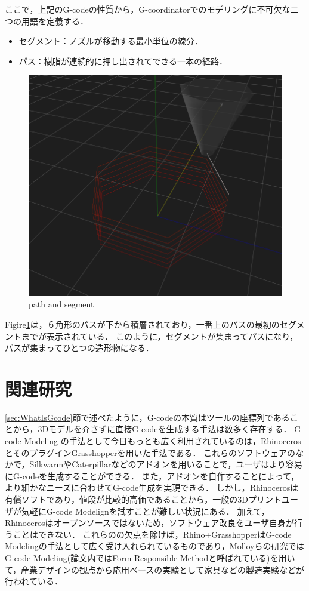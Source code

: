 \documentclass{article}
\begin{document}
\begin{twocolumn}
ここで，上記のG-codeの性質から，G-coordinatorでのモデリングに不可欠な二つの用語を定義する．
\begin{itemize}
  \item セグメント：ノズルが移動する最小単位の線分．
  \item パス：樹脂が連続的に押し出されてできる一本の経路．
\end{itemize}
\begin{figure}[h]
  \centering
  \includegraphics[width=0.8\linewidth]{img/path_segment.png}
  \caption{path and segment}
  \label{fig:2}
\end{figure}
Figire\ref{fig:2}は，６角形のパスが下から積層されており，一番上のパスの最初のセグメントまでが表示されている．
このように，セグメントが集まってパスになり，パスが集まってひとつの造形物になる．




\section{関連研究}

\ref{sec:WhatIsGcode}節で述べたように，G-codeの本質はツールの座標列であることから，3Dモデルを介さずに直接G-codeを生成する手法は数多く存在する．
G-code Modeling の手法として今日もっとも広く利用されているのは，RhinocerosとそのプラグインGrasshopperを用いた手法である．
これらのソフトウェアのなかで，Silkwarm\cite{silkworm}やCaterpillar\cite{caterpillar}などのアドオンを用いることで，ユーザはより容易にG-codeを生成することができる．
また，アドオンを自作することによって，より細かなニーズに合わせてG-code生成を実現できる．
しかし，Rhinocerosは有償ソフトであり，値段が比較的高価であることから，一般の3Dプリントユーザが気軽にG-code Modelignを試すことが難しい状況にある．
加えて，Rhinocerosはオープンソースではないため，ソフトウェア改良をユーザ自身が行うことはできない．
これらのの欠点を除けば，Rhino+GrasshopperはG-code Modelingの手法として広く受け入れられているものであり，Molloyらの研究\cite{molloy2018digital}では
G-code Modeling(論文内ではForm Responsible Methodと呼ばれている)を用いて，産業デザインの観点から応用ベースの実験として家具などの製造実験などが行われている．


\end{twocolumn}
\end{document}
